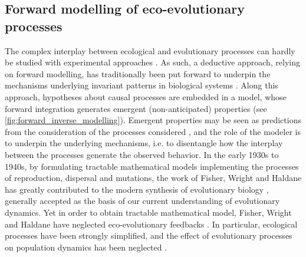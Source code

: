 \subsection{Forward modelling of eco-evolutionary processes}
The complex interplay between ecological and evolutionary processes can hardly be studied with experimental approaches \citep{Pontarp2019,Hagen2022}. 
As such, a deductive approach, relying on forward modelling, has traditionally been put forward to underpin the mechanisms underlying invariant patterns in biological systems \citep{Brummitt2020}. Along this approach, hypotheses about causal processes are embedded in a model, whose forward integration generates emergent (non-anticipated) properties (see \cref{fig:forward_inverse_modelling}). Emergent properties may be seen as predictions from the consideration of the processes considered \citep{May2004}, and the role of the modeler is to underpin the underlying mechanisms, i.e. to disentangle how the interplay between the processes generate the observed behavior. 
% 
% 
In the early 1930s to 1940s, by formulating tractable mathematical models implementing the processes of reproduction, dispersal and mutations, the work of Fisher, Wright and Haldane has greatly contributed to the modern synthesis of evolutionary biology \citep{huxley1942evolution}, generally accepted as the basis of our current understanding of evolutionary dynamics. 
% 
% 
Yet in order to obtain tractable mathematical model, Fisher, Wright and Haldane have neglected eco-evolutionary feedbacks \citep{Govaert2019a}. In particular, ecological processes have been strongly simplified, and the effect of evolutionary processes on population dynamics has been neglected \citep{Lion2022}.

